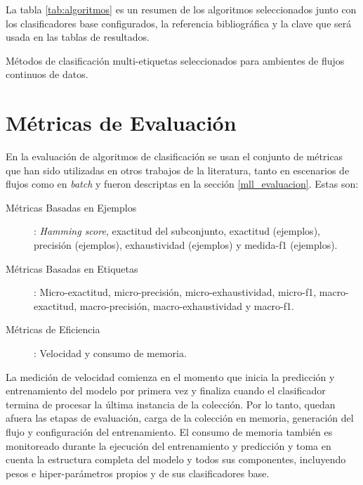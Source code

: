 La tabla \ref{tab:algoritmos} es un resumen de los algoritmos seleccionados
junto con los clasificadores base configurados, la referencia bibliográfica y la
clave que será usada en las tablas de resultados.

\begin{table}[htbp]
	\centering
	\begin{adjustbox}{max width=\textwidth}
		
	\end{adjustbox}
	\caption{Métodos de clasificación multi-etiquetas seleccionados para ambientes
		de flujos continuos de datos.}
	\label{tab:algoritmos}
\end{table}

\section{Métricas de Evaluación}

En la evaluación de algoritmos de clasificación se usan el conjunto de métricas
que han sido utilizadas en otros trabajos de la literatura, tanto en escenarios
de flujos \cite{sousa_multi-label_2018, zheng_survey_2020,
	osojnik_multi-label_2017} como en \textit{batch} \cite{madjarov_extensive_2012,
	zhang_multi-label_2010, gibaja_tutorial_2015} y fueron descriptas en la
sección \ref{mll_evaluacion}. Estas son:

\begin{description}

	\item[Métricas Basadas en Ejemplos]: \textit{Hamming score}, exactitud del
	      subconjunto, exactitud (ejemplos), precisión (ejemplos), exhaustividad
	      (ejemplos) y medida-f1 (ejemplos).

	\item[Métricas Basadas en Etiquetas]: Micro-exactitud, micro-precisión,
	      micro-exhaustividad, micro-f1, macro-exactitud, macro-precisión,
	      macro-exhaustividad y macro-f1.

	\item[Métricas de Eficiencia]: Velocidad y consumo de memoria.

\end{description}

La medición de velocidad comienza en el momento que inicia la predicción y
entrenamiento del modelo por primera vez y finaliza cuando el clasificador
termina de procesar la última instancia de la colección. Por lo tanto, quedan
afuera las etapas de evaluación, carga de la colección en memoria, generación
del flujo y configuración del entrenamiento. El consumo de memoria también es
monitoreado durante la ejecución del entrenamiento y predicción y toma en cuenta
la estructura completa del modelo y todos sus componentes, incluyendo pesos e
hiper-parámetros propios y de sus clasificadores base.

